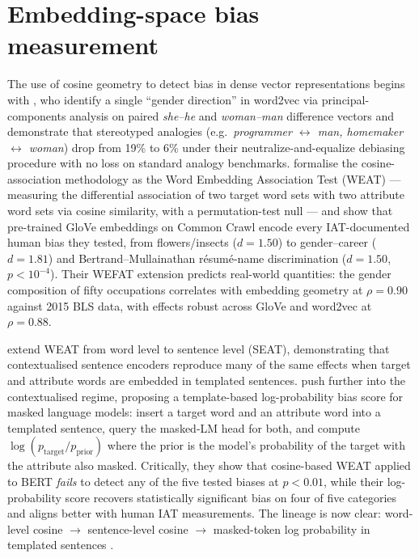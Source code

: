 \section{Embedding-space bias measurement}\label{sec:embedding_bias}

The use of cosine geometry to detect bias in dense vector representations
begins with \citet{bolukbasi2016man}, who identify a single ``gender
direction'' in word2vec via principal-components analysis on paired
\emph{she--he} and \emph{woman--man} difference vectors and demonstrate
that stereotyped analogies (e.g.\ \emph{programmer $\leftrightarrow$
man, homemaker $\leftrightarrow$ woman}) drop from 19\% to 6\% under
their neutralize-and-equalize debiasing procedure with no loss on
standard analogy benchmarks. \citet{caliskan2017semantics} formalise the
cosine-association methodology as the Word Embedding Association Test
(WEAT) --- measuring the differential association of two target word
sets with two attribute word sets via cosine similarity, with a
permutation-test null --- and show that pre-trained GloVe embeddings on
Common Crawl encode every IAT-documented human bias they tested, from
flowers/insects ($d = 1.50$) to gender--career ($d = 1.81$) and
Bertrand--Mullainathan r\'esum\'e-name discrimination ($d = 1.50$,
$p < 10^{-4}$). Their WEFAT extension predicts real-world quantities:
the gender composition of fifty occupations correlates with embedding
geometry at $\rho = 0.90$ against 2015 BLS data, with effects robust
across GloVe and word2vec at $\rho = 0.88$.

{\sloppy
\citet{may2019} extend WEAT from word level to sentence level (SEAT),
demonstrating that contextualised sentence encoders reproduce many of
the same effects when target and attribute words are embedded in
templated sentences. \citet{kurita2019measuring} push further into the
contextualised regime, proposing a template-based log-probability bias
score for masked language models: insert a target word and an attribute
word into a templated sentence, query the masked-LM head for both, and
compute $\log(p_\text{target} / p_\text{prior})$ where the prior is the
model's probability of the target with the attribute also masked.
Critically, they show that cosine-based WEAT applied to BERT
\emph{fails} to detect any of the five tested biases at $p < 0.01$,
while their log-probability score recovers statistically significant
bias on four of five categories and aligns better with human IAT
measurements. The lineage is now clear: word-level cosine
\citep{bolukbasi2016man, caliskan2017semantics} $\rightarrow$
sentence-level cosine \citep{may2019} $\rightarrow$ masked-token log
probability in templated sentences \citep{kurita2019measuring}.\par}

